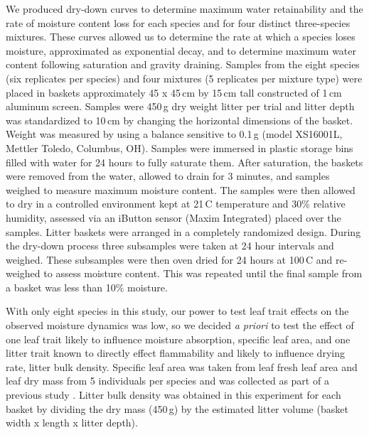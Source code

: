 \documentclass[fire,article,submit,moreauthors,pdftex]{Definitions/mdpi}
\begin{document}
We produced dry-down curves to determine maximum water retainability and the
rate of moisture content loss for each species and for four distinct
three-species mixtures. These curves allowed us to determine the rate at which
a species loses moisture, approximated as exponential decay, and to determine
maximum water content following saturation and gravity draining. Samples from
the eight species (six replicates per species) and four mixtures (5 replicates
per mixture type) were placed in baskets approximately 45 x 45\,cm by 15\,cm
tall constructed of 1\,cm aluminum screen. Samples were 450\,g dry weight
litter per trial and litter depth was standardized to 10\,cm by changing the
horizontal dimensions of the basket. Weight was measured by using a balance
sensitive to 0.1\,g (model XS16001L, Mettler Toledo, Columbus, OH). Samples
were immersed in plastic storage bins filled with water for 24 hours to fully
saturate them. After saturation, the baskets were removed from the water,
allowed to drain for 3 minutes, and samples weighed to measure maximum moisture
content. The samples were then allowed to dry in a controlled environment kept
at 21\,C temperature and 30\% relative humidity, assessed via an iButton sensor
(Maxim Integrated) placed over the samples. Litter baskets were arranged in a
completely randomized design. During the dry-down process three subsamples were
taken at 24 hour intervals and weighed. These subsamples were then oven dried
for 24 hours at 100\,C and re-weighed to assess moisture content. This was
repeated until the final sample from a basket was less than 10\% moisture.




With only eight species in this study, our power to test leaf trait effects on
the observed moisture dynamics was low, so we decided \emph{a priori} to test
the effect of one leaf trait likely to influence moisture absorption, specific
leaf area, and one litter trait known to directly effect flammability and
likely to influence drying rate, litter bulk density. Specific leaf area was
taken from leaf fresh leaf area and leaf dry mass from 5 individuals per
species and was collected as part of a previous study
\cite{Magalhaes+Schwilk-2012}. Litter bulk density was obtained in this
experiment for each basket by dividing the dry mass (450\,g) by the estimated
litter volume (basket width x length x litter depth).
\end{document}
